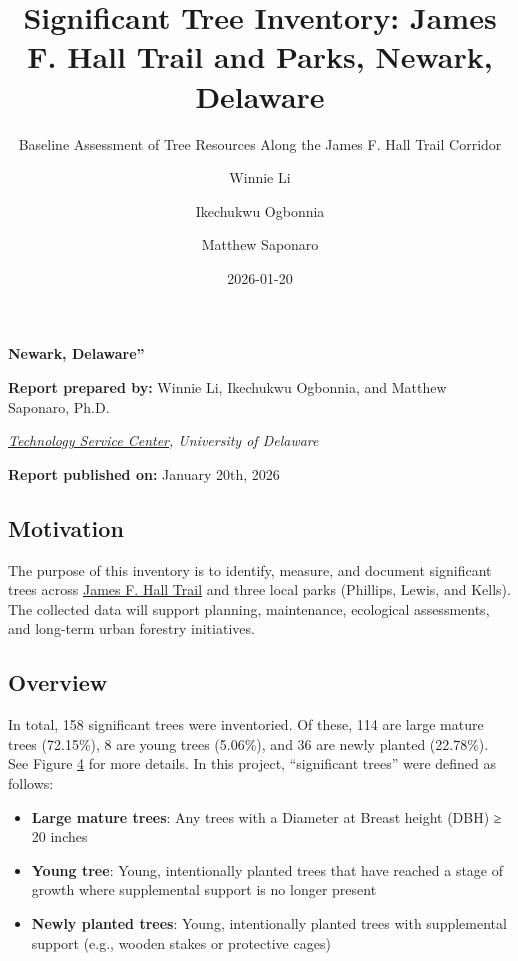 \documentclass[
  letterpaper,
  DIV=11,
  numbers=noendperiod]{scrartcl}
\title{Significant Tree Inventory: James F. Hall Trail and Parks,
Newark, Delaware}
\subtitle{Baseline Assessment of Tree Resources Along the James F. Hall
Trail Corridor}
\author{Winnie Li \and Ikechukwu Ogbonnia \and Matthew Saponaro}
\date{2026-01-20}
\providecommand{\tightlist}{%
  \setlength{\itemsep}{0pt}\setlength{\parskip}{0pt}}
\renewcommand*\contentsname{Table of contents}
\newcommand\contentsname{Table of contents}
\begin{document}
\maketitle

\renewcommand*\contentsname{Table of contents}
{
\hypersetup{linkcolor=}
\setcounter{tocdepth}{3}
\tableofcontents
}

\textbf{Newark, Delaware''}

\textbf{Report prepared by:} Winnie Li, Ikechukwu Ogbonnia, and Matthew
Saponaro, Ph.D.

\href{https://www.sites.udel.edu/technology-service-center}{\emph{Technology
Service Center}}\emph{, University of Delaware}

\textbf{Report published on:} January 20th, 2026

\subsection{Motivation}\label{motivation}

The purpose of this inventory is to identify, measure, and document
significant trees across
\href{https://delawaregreenways.org/trail/james-f-hall-trail/}{James F.
Hall Trail} and three local parks (Phillips, Lewis, and Kells). The
collected data will support planning, maintenance, ecological
assessments, and long-term urban forestry initiatives.

\subsection{Overview}\label{overview}

In total, 158 significant trees were inventoried. Of these, 114 are
large mature trees (72.15\%), 8 are young trees (5.06\%), and 36 are
newly planted (22.78\%). See Figure
\href{inventoryInsights.html\#large-mature-trees-concentrate-at-kells-park-while-newly-planted-trees-are-predominantly-in-jh-p}{4}
for more details. In this project, ``significant trees'' were defined as
follows:

\begin{itemize}
\tightlist
\item
  \textbf{Large mature trees}: Any trees with a Diameter at Breast
  height (DBH) ≥ 20 inches
\item
  \textbf{Young tree}: Young, intentionally planted trees that have
  reached a stage of growth where supplemental support is no longer
  present
\item
  \textbf{Newly planted trees}: Young, intentionally planted trees with
  supplemental support (e.g., wooden stakes or protective cages)
\end{itemize}
\end{document}
